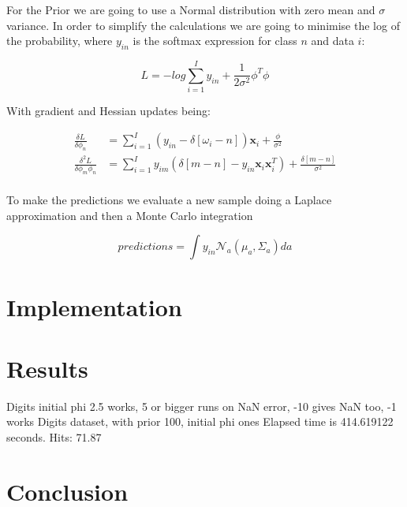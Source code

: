 \documentclass[12pt]{article}
\begin{document}
For the Prior we are going to use a Normal distribution with zero mean and $\sigma$ variance.
In order to simplify the calculations we are going to minimise the log of the probability, where $y_{in}$ is the softmax expression for class $n$ and data $i$:

\begin{equation}
\label{L}
L = - log \sum_{i = 1}^{I} y_{in} + \frac{1}{2 \sigma^{2}} \phi^{T} \phi 
\end{equation}

With gradient and Hessian updates being:

\begin{align}
\label{L}
\frac{\delta L}{ \delta \phi_{n}} &= \sum_{i = 1}^{I} \left( y_{in} - \delta \left[ \omega_{i} - n \right] \right) \mathbf{x}_{i}  + \frac{\phi} {\sigma^{2}} \nonumber \\
\frac{\delta^{2} L}{ \delta \phi_{m}\phi_{n}} &= \sum_{i = 1}^{I} y_{im} \left( \delta \left[ m - n \right] - y_{in} \mathbf{x}_{i} \mathbf{x}_{i}^{T}  \right) +  \frac{\delta \left[ m - n \right]}{\sigma^{2}} \nonumber \\
\end{align}

To make the predictions we evaluate a new sample doing a Laplace approximation and then a Monte Carlo integration

\begin{equation}
\label{Predictions}
predictions = \int y_{in} \mathcal{N}_{a} \left( \mu_{a}, \Sigma_{a} \right) da
\end{equation}
 
\section{Implementation}


\section{Results}

Digits initial phi 2.5 works, 5 or bigger runs on NaN error,  -10 gives NaN too, -1 works
Digits dataset, with prior 100, initial phi ones
Elapsed time is 414.619122 seconds.
Hits: 71.87%

\section{Conclusion}


 
\end{document}
